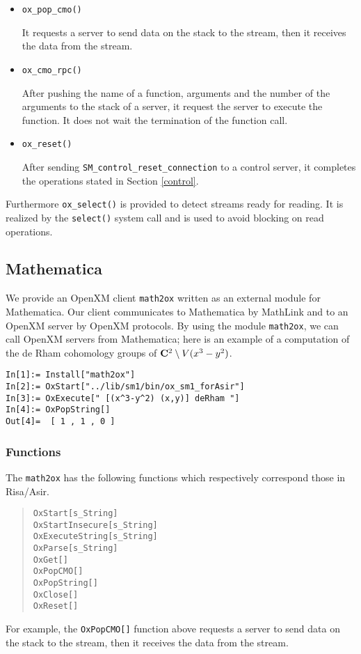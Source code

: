 \begin{itemize}
\item {\tt ox\_pop\_cmo()}

It requests a server to send data on the stack to the stream, then
it receives the data from the stream.

\item {\tt ox\_cmo\_rpc()}

After pushing the name of a function, arguments and the number of the
arguments to the stack of a server, it request the server to execute
the function. It does not wait the termination of the function call.

\item {\tt ox\_reset()}

After sending {\tt SM\_control\_reset\_connection} to a control server,
it completes the operations stated in Section \ref{control}.
\end{itemize}
Furthermore {\tt ox\_select()} is provided to detect streams ready for
reading. It is realized by the {\tt select()} system call and is used
to avoid blocking on read operations.

\subsection{Mathematica}

We provide an OpenXM client {\tt math2ox} written as an external module
for Mathematica.  Our client communicates to Mathematica by MathLink and
to an OpenXM server by OpenXM protocols.  
By using the module {\tt math2ox},
we can call OpenXM servers from Mathematica;
here is an example of a computation of the de Rham cohomology groups
of ${\bf C}^2 \setminus V(x^3-y^2)$.
{\footnotesize
\begin{verbatim}
In[1]:= Install["math2ox"]
In[2]:= OxStart["../lib/sm1/bin/ox_sm1_forAsir"]
In[3]:= OxExecute[" [(x^3-y^2) (x,y)] deRham "]
In[4]:= OxPopString[]
Out[4]=  [ 1 , 1 , 0 ] 
\end{verbatim}
}

\subsubsection{Functions}

The {\tt math2ox} has the following functions 
which respectively correspond those in Risa/Asir.
\begin{quote}
{\tt OxStart[s\_String]} \\
{\tt OxStartInsecure[s\_String]} \\
{\tt OxExecuteString[s\_String]}  \\
{\tt OxParse[s\_String]} \\
{\tt OxGet[]} \\
{\tt OxPopCMO[]} \\
{\tt OxPopString[]} \\
{\tt OxClose[]} \\
{\tt OxReset[]}
\end{quote}
For example, the {\tt OxPopCMO[]} function above requests a server to
send data on the stack to the stream, then it receives the data from the
stream.

